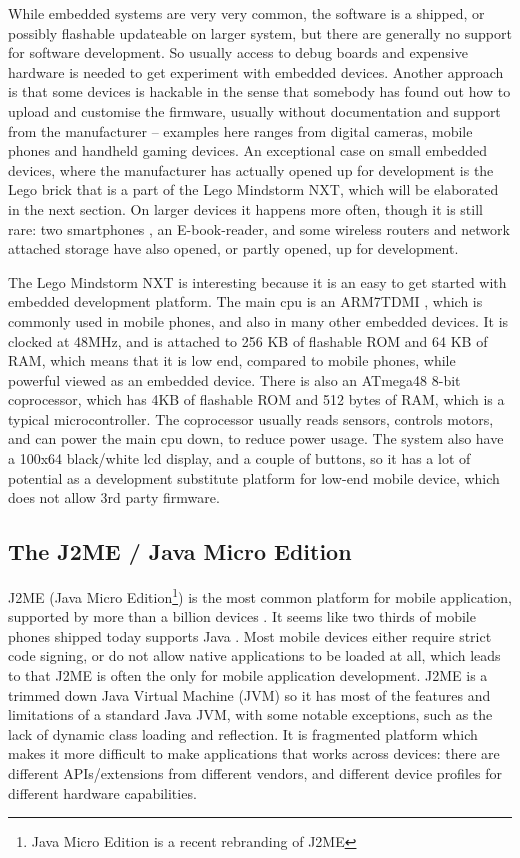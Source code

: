 \documentclass[11pt]{report}
\begin{document}
While embedded systems are very very common, the software is a shipped, or possibly flashable updateable on larger system, but there are generally no support for software development.
So usually access to debug boards and expensive hardware is needed to get experiment with embedded devices.
Another approach is that some devices is hackable in the sense that somebody has found out how to upload and customise the firmware, usually without documentation and support from the manufacturer -- examples here ranges from digital cameras, mobile phones and handheld gaming devices.
An exceptional case on small embedded devices, where the manufacturer has actually opened up for development is the Lego brick that is a part of the Lego Mindstorm NXT, which will be elaborated in the next section.
On larger devices it happens more often, though it is still rare: two smartphones \cite{openmoko, htc-android}, an E-book-reader, and some wireless routers and network attached storage \cite{wrtg, nslu, buffalo} have also opened, or partly opened, up for development.

The Lego Mindstorm NXT is interesting because it is an easy to get started with embedded development platform. 
The main cpu is an ARM7TDMI \cite{arm7tdmi}, which is commonly used in mobile phones, and also in many other embedded devices. 
It is clocked at 48MHz, and is attached to 256 KB of flashable ROM and 64 KB of RAM, which means that it is low end, compared to mobile phones, while powerful viewed as an embedded device.
There is also an ATmega48 \cite{atmega48} 8-bit coprocessor, which has 4KB of flashable ROM and 512 bytes of RAM, which is a typical microcontroller. 
The coprocessor usually reads sensors, controls motors, and can power the main cpu down, to reduce power usage.
The system also have a 100x64 black/white lcd display, and a couple of buttons, so it has a lot of potential as a development substitute platform for low-end mobile device, which does not allow 3rd party firmware.

\subsection{The J2ME / Java Micro Edition}
J2ME (Java Micro Edition\footnote{Java Micro Edition is a recent rebranding of J2ME}) is the most common platform for mobile application, supported by more than a billion devices \cite{sun-j2me}. 
It seems like two thirds of mobile phones shipped today supports Java \cite{esmertec-globenews}.
Most mobile devices either require strict code signing, or do not allow native applications to be loaded at all, which leads to that J2ME is often the only for mobile application development.
J2ME is a trimmed down Java Virtual Machine (JVM) so it has most of the features and limitations of a standard Java JVM, with some notable exceptions, such as the lack of dynamic class loading and reflection. It is fragmented platform which makes it more difficult to make applications that works across devices: there are different APIs/extensions from different vendors, and different device profiles for different hardware capabilities.
\end{document}
